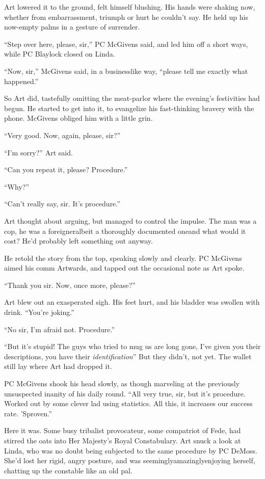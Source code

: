 Art lowered it to the ground, felt himself blushing. His hands were
shaking now, whether from embarrassment, triumph or hurt he
couldn’t say. He held up his now-empty palms in a gesture of
surrender.

“Step over here, please, sir,” PC McGivens said, and led him off a
short ways, while PC Blaylock closed on Linda.

“Now, sir,” McGivens said, in a businesslike way, “please tell me
exactly what happened.”

So Art did, tastefully omitting the meat-parlor where the eve\-ning’s
festivities had begun. He started to get into it, to evangelize his
fast-thinking bravery with the phone. McGivens obliged him with a
little grin.

“Very good. Now, again, please, sir?”

“I’m sorry?” Art said.

“Can you repeat it, please? Procedure.”

“Why?”

“Can’t really say, sir. It’s procedure.”

Art thought about arguing, but managed to control the impulse. The
man was a cop, he was a foreigner{\dash}albeit a thoroughly documented
one{\dash}and what would it cost? He’d probably left something out
anyway.

He retold the story from the top, speaking slowly and clearly. PC
McGivens aimed his comm Artwards, and tapped out the occasional
note as Art spoke.

“Thank you sir. Now, once more, please?”

Art blew out an exasperated sigh. His feet hurt, and his bladder
was swollen with drink. “You’re joking.”

“No sir, I’m afraid not. Procedure.”

“But it’s stupid! The guys who tried to mug us are long gone, I’ve
given you their descriptions, you have their
\emph{identification}{\dash}” But they didn’t, not yet. The wallet still
lay where Art had dropped it.

PC McGivens shook his head slowly, as though marveling at the
previously unsuspected inanity of his daily round. “All very true,
sir, but it’s procedure. Worked out by some clever lad using
statistics. All this, it increases our success rate. ’Sproven.”

Here it was. Some busy tribalist provocateur, some compatriot of
Fede, had stirred the oats into Her Majesty’s Royal Constabulary.
Art snuck a look at Linda, who was no doubt being subjected to the
same procedure by PC DeMoss. She’d lost her rigid, angry posture,
and was seemingly{\dash}amazingly{\dash}enjoying herself, chatting up the
constable like an old pal.

